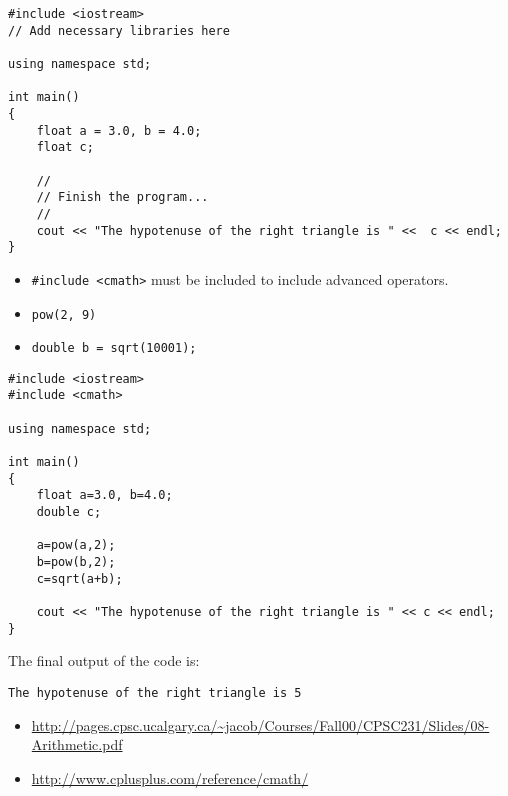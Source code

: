 \begin{lstlisting}
#include <iostream>
// Add necessary libraries here

using namespace std;

int main()
{
	float a = 3.0, b = 4.0;
	float c;
	
	//
	// Finish the program...
	//
	cout << "The hypotenuse of the right triangle is " <<  c << endl;
}
\end{lstlisting}


\begin{itemize}
\item \texttt{\#include <cmath>} must be included to include advanced operators.
\item \texttt{pow(2, 9)}
\item \texttt{double b = sqrt(10001);}
\end{itemize}


\begin{lstlisting}
#include <iostream>
#include <cmath>

using namespace std;

int main()
{
	float a=3.0, b=4.0;
	double c;
	
	a=pow(a,2);
	b=pow(b,2);
	c=sqrt(a+b);

	cout << "The hypotenuse of the right triangle is " << c << endl;
}
\end{lstlisting}

The final output of the code is: 

\texttt{The hypotenuse of the right triangle is 5}


\begin{itemize}
\item \url{http://pages.cpsc.ucalgary.ca/~jacob/Courses/Fall00/CPSC231/Slides/08-Arithmetic.pdf}
\item \url{http://www.cplusplus.com/reference/cmath/}
\end{itemize}
